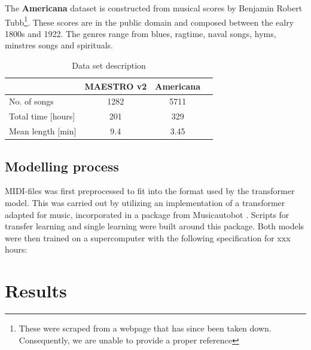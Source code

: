 \documentclass{IEEEtran}
\begin{document}
        The \textbf{Americana} dataset is constructed from musical scores by 
        Benjamin Robert Tubb\footnote{These were scraped from a webpage that has 
        since been taken down. Consequently, we are unable to provide a proper 
        reference}. These scores are in the public domain and composed between
        the ealry 1800s and 1922. The genres range from blues, ragtime, naval songs,
        hyms, minstres songs and spirituals. 
    
        \begin{table}
        \begin{center}
            \caption{Data set description \label{tab:data}}
            \begin{tabular}{l c c c} \hline
                & MAESTRO v2 & Americana \\ \hline\hline
            No. of songs & 1282 & 5711 \\ \hline
            Total time [hours] & 201 & 329 \\ \hline
            Mean length [min] & 9.4 & 3.45  \\ \hline
        \end{tabular}
        \end{center}
        \end{table}

    \subsection{Modelling process}
        MIDI-files was first preprocessed to fit into the format used by the transformer model.
        This was carried out by utilizing an implementation of a transformer adapted for music, 
        incorporated in a package from Musicautobot \cite{musicautobot}. Scripts for transfer learning and
        single learning were built around this package. Both models were then trained on a supercomputer
        with the following specification for xxx hours:

    \section{Results}
\end{document}
